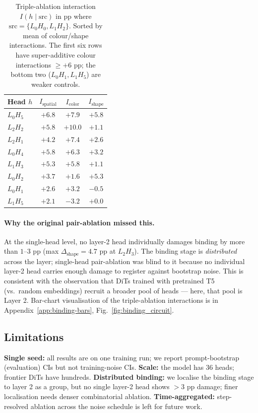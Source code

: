\documentclass{article}
\begin{document}
\begin{table}[t]
\centering
\small
\caption{Triple-ablation interaction $I(h \mid \text{src})$ in pp where $\text{src} = \{L_0H_0, L_1H_2\}$. Sorted by mean of colour/shape interactions. The first six rows have super-additive colour interactions $\geq +6$ pp; the bottom two ($L_0H_1, L_1H_5$) are weaker controls.}
\label{tab:triple}
\begin{tabular}{lccc}
\toprule
Head $h$ & $I_\text{spatial}$ & $I_\text{color}$ & $I_\text{shape}$ \\
\midrule
$L_0H_5$ & $+6.8$ & $\mathbf{+7.9}$ & $\mathbf{+5.8}$ \\
$L_2H_2$ & $+5.8$ & $\mathbf{+10.0}$ & $+1.1$ \\
$L_2H_1$ & $+4.2$ & $\mathbf{+7.4}$ & $+2.6$ \\
$L_0H_4$ & $+5.8$ & $+6.3$ & $+3.2$ \\
$L_1H_3$ & $+5.3$ & $+5.8$ & $+1.1$ \\
$L_0H_2$ & $+3.7$ & $+1.6$ & $+5.3$ \\
$L_0H_1$ & $+2.6$ & $+3.2$ & $-0.5$ \\
$L_1H_5$ & $+2.1$ & $-3.2$ & $+0.0$ \\
\bottomrule
\end{tabular}
\end{table}

\paragraph{Why the original pair-ablation missed this.}
\label{sec:single-binding}
At the single-head level, no layer-2 head individually damages binding by more than $1$--$3$ pp (max $\Delta_\text{shape} = 4.7$ pp at $L_2H_3$). The binding stage is \emph{distributed} across the layer; single-head pair-ablation was blind to it because no individual layer-2 head carries enough damage to register against bootstrap noise. This is consistent with the \citet{wang2026circuit} observation that DiTs trained with pretrained T5 (vs.\ random embeddings) recruit a broader pool of heads --- here, that pool is Layer 2. Bar-chart visualisation of the triple-ablation interactions is in Appendix~\ref{app:binding-bars}, Fig.~\ref{fig:binding_circuit}.

\subsection{Limitations}
\label{sec:limitations}
\textbf{Single seed:} all results are on one training run; we report prompt-bootstrap (evaluation) CIs but not training-noise CIs. \textbf{Scale:} the model has 36 heads; frontier DiTs have hundreds. \textbf{Distributed binding:} we localise the binding stage to layer 2 as a group, but no single layer-2 head shows $\!>\!3$ pp damage; finer localisation needs denser combinatorial ablation. \textbf{Time-aggregated:} step-resolved ablation across the noise schedule is left for future work.
\end{document}
